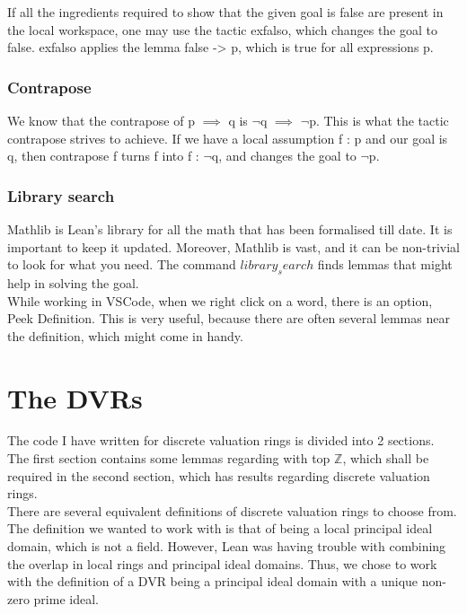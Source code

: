 \documentclass[10pt, a4paper]{article}
\begin{document}
If all the ingredients required to show that the given goal is false are present in the local workspace, one may use the tactic exfalso, which changes the goal to false. exfalso applies the lemma false -> p, which is true for all expressions p.

\subsubsection{Contrapose}
We know that the contrapose of p $\implies$ q is $\lnot$q $\implies$ $\lnot$p. This is what the tactic contrapose strives to achieve. If we have a local assumption f : p and our goal is q, then contrapose f turns f into f : $\lnot$q, and changes the goal to $\lnot$p. 

\subsubsection{Library search}
Mathlib is Lean's library for all the math that has been formalised till date. It is important to keep it updated. Moreover, Mathlib is vast, and it can be non-trivial to look for what you need. The command $library_search$ finds lemmas that might help in solving the goal. \\

While working in VSCode, when we right click on a word, there is an option, Peek Definition. This is very useful, because there are often several lemmas near the definition, which might come in handy. \\

\section{The DVRs}

The code I have written for discrete valuation rings is divided into 2 sections. The first section contains some lemmas regarding with top $\mathbb{Z}$, which shall be required in the second section, which has results regarding discrete valuation rings. \\

There are several equivalent definitions of discrete valuation rings to choose from. The definition we wanted to work with is that of being a local principal ideal domain, which is not a field. However, Lean was having trouble with combining the overlap in local rings and principal ideal domains. Thus, we chose to work with the definition of a DVR being a principal ideal domain with a unique non-zero prime ideal. \\
\end{document}
